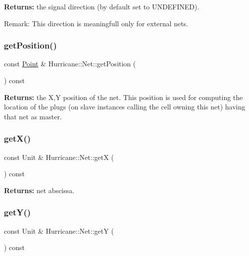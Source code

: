 {\bfseries Returns\+:} the signal direction (by default set to U\+N\+D\+E\+F\+I\+N\+ED).

\begin{DoxyParagraph}{Remark\+: This direction is meaningfull only for external nets. }

\end{DoxyParagraph}
\mbox{\label{classHurricane_1_1Net_abcfdec9c953d228845fdb9d75e8173cc}} 
\subsubsection{\texorpdfstring{get\+Position()}{getPosition()}}
{\footnotesize\ttfamily const \mbox{\hyperlink{classHurricane_1_1Point}{Point}} \& Hurricane\+::\+Net\+::get\+Position (\begin{DoxyParamCaption}{ }\end{DoxyParamCaption}) const\hspace{0.3cm}{\ttfamily [inline]}}

{\bfseries Returns\+:} the X,Y position of the net. This position is used for computing the location of the plugs (on slave instances calling the cell owning this net) having that net as master. \mbox{\label{classHurricane_1_1Net_a1f8f4c4632614b84a1227a1da8310428}} 
\subsubsection{\texorpdfstring{get\+X()}{getX()}}
{\footnotesize\ttfamily const Unit \& Hurricane\+::\+Net\+::getX (\begin{DoxyParamCaption}{ }\end{DoxyParamCaption}) const\hspace{0.3cm}{\ttfamily [inline]}}

{\bfseries Returns\+:} net abscissa. \mbox{\label{classHurricane_1_1Net_aa97899b408aa47ec22792b5c6d6e9216}} 
\subsubsection{\texorpdfstring{get\+Y()}{getY()}}
{\footnotesize\ttfamily const Unit \& Hurricane\+::\+Net\+::getY (\begin{DoxyParamCaption}{ }\end{DoxyParamCaption}) const\hspace{0.3cm}{\ttfamily [inline]}}

